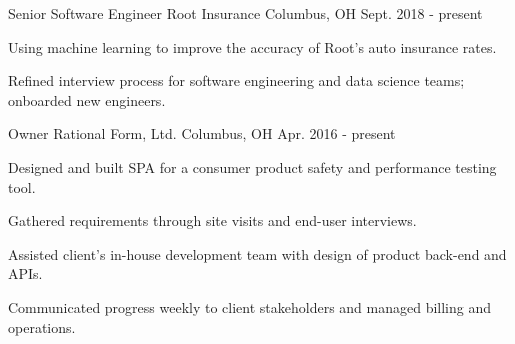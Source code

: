 

\begin{cventries}

  \cventry
    {Senior Software Engineer} %
    {Root Insurance} %
    {Columbus, OH} %
    {Sept. 2018 - present} %
    {
      \begin{cvitems} %
        \item {Using machine learning to improve the accuracy of Root's auto insurance rates.}
        \item {Refined interview process for software engineering and data science teams; onboarded new engineers.}
      \end{cvitems}
    }

  \cventry
    {Owner} %
    {Rational Form, Ltd.} %
    {Columbus, OH} %
    {Apr. 2016 - present} %
    {
      \begin{cvitems} %
        \item {Designed and built SPA for a consumer product safety and performance testing tool.}
        \item {Gathered requirements through site visits and end-user interviews.}
        \item {Assisted client's in-house development team with design of product back-end and APIs.}
        \item {Communicated progress weekly to client stakeholders and managed billing and operations.}
      \end{cvitems}
    }


\end{cventries}
